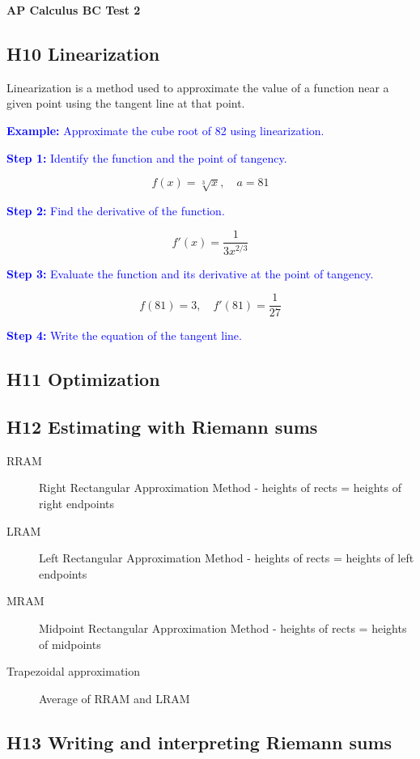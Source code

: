 \documentclass[letterpaper, 12pt]{article}
\newcommand{\example}[1]{\textcolor{blue}{\textbf{Example:} #1}}
\newcommand{\step}[2]{\textcolor{blue}{\textbf{Step #1:} #2}}
\begin{document}
\begin{center}
\textbf{{\Large AP Calculus BC Test 2}}
\end{center}

\subsection*{H10 Linearization}

Linearization is a method used to approximate the value of a function near a given point using the tangent line at that point. 

\example{Approximate the cube root of 82 using linearization.}

\step{1}{Identify the function and the point of tangency.}

$$f(x) = \sqrt[3]{x}, \quad a = 81$$

\step{2}{Find the derivative of the function.}

$$f'(x) = \frac{1}{3x^{2/3}}$$

\step{3}{Evaluate the function and its derivative at the point of tangency.}

$$f(81) = 3, \quad f'(81) = \frac{1}{27}$$

\step{4}{Write the equation of the tangent line.}

\subsection*{H11 Optimization}

\subsection*{H12 Estimating with Riemann sums}

\begin{description}
\item [RRAM] Right Rectangular Approximation Method - heights of rects = heights of right endpoints
\item [LRAM] Left Rectangular Approximation Method - heights of rects = heights of left endpoints
\item [MRAM] Midpoint Rectangular Approximation Method - heights of rects = heights of midpoints
\item [Trapezoidal approximation] Average of RRAM and LRAM
\end{description}



\subsection*{H13 Writing and interpreting Riemann sums}
\end{document}
